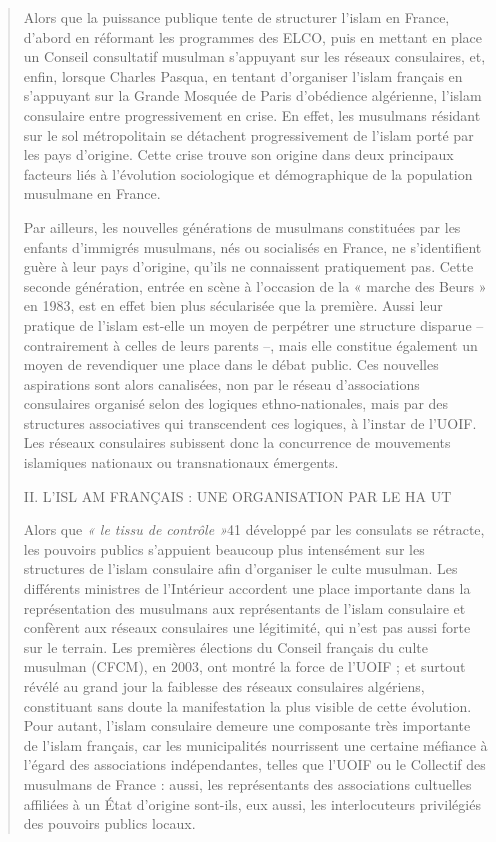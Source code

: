 \begin{quote}
Alors que la puissance publique tente de structurer l'islam en France,
d'abord en réformant les programmes des ELCO, puis en mettant en place
un Conseil consultatif musulman s'appuyant sur les réseaux consulaires,
et, enfin, lorsque Charles Pasqua, en tentant d'organiser l'islam
français en s'appuyant sur la Grande Mosquée de Paris d'obédience
algérienne, l'islam consulaire entre progressivement en crise. En effet,
les musulmans résidant sur le sol métropolitain se détachent
progressivement de l'islam porté par les pays d'origine. Cette crise
trouve son origine dans deux principaux facteurs liés à l'évolution
sociologique et démographique de la population musulmane en France.

Par ailleurs, les nouvelles générations de musulmans constituées par les
enfants d'immigrés musulmans, nés ou socialisés en France, ne
s'identifient guère à leur pays d'origine, qu'ils ne connaissent
pratiquement pas. Cette seconde génération, entrée en scène à l'occasion
de la « marche des Beurs » en 1983, est en effet bien plus sécularisée
que la première. Aussi leur pratique de l'islam est-elle un moyen de
perpétrer une structure disparue -- contrairement à celles de leurs
parents --, mais elle constitue également un moyen de revendiquer une
place dans le débat public. Ces nouvelles aspirations sont alors
canalisées, non par le réseau d'associations consulaires organisé selon
des logiques ethno-nationales, mais par des structures associatives qui
transcendent ces logiques, à l'instar de l'UOIF. Les réseaux consulaires
subissent donc la concurrence de mouvements islamiques nationaux ou
transnationaux émergents.

II. L'ISL AM FRANÇAIS : UNE ORGANISATION PAR LE HA UT

Alors que \emph{« le tissu de contrôle »}41 développé par les consulats
se rétracte, les pouvoirs publics s'appuient beaucoup plus intensément
sur les structures de l'islam consulaire afin d'organiser le culte
musulman. Les différents ministres de l'Intérieur accordent une place
importante dans la représentation des musulmans aux représentants de
l'islam consulaire et confèrent aux réseaux consulaires une légitimité,
qui n'est pas aussi forte sur le terrain. Les premières élections du
Conseil français du culte musulman (CFCM), en 2003, ont montré la force
de l'UOIF ; et surtout révélé au grand jour la faiblesse des réseaux
consulaires algériens, constituant sans doute la manifestation la plus
visible de cette évolution. Pour autant, l'islam consulaire demeure une
composante très importante de l'islam français, car les municipalités
nourrissent une certaine méfiance à l'égard des associations
indépendantes, telles que l'UOIF ou le Collectif des musulmans de France
: aussi, les représentants des associations cultuelles affiliées à un
État d'origine sont-ils, eux aussi, les interlocuteurs privilégiés des
pouvoirs publics locaux.


\end{quote}
